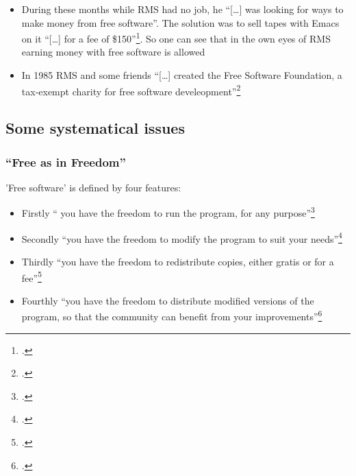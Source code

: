 \documentclass[DIV=calc,BCOR=5mm,11pt,headings=small,oneside,abstract=true, toc=bib]{scrartcl}
\begin{document}
\begin{itemize}
{  software}\footcite[cf][18]{Stallman1999a}. To give up the job was
  essential for RMS because he did not want to allow the MIT to cover his
  work\footcite[cf][18]{Stallman1999a}. But nevertheless he was supported by the
  MIT: they \enquote{[\ldots] kindly invited (him) to keep using the lab’s
  facilities}\footcite[cf][19]{Stallman1999a}:
  \begin{itemize}
    \item Firstly RMS evaluated wether he could reuse any existing compiler.
    Later on he had to write hiw own compiler, the
    GCC\footcite[cf][19]{Stallman1999a}
    \item From Sepmtember 1984 on he wrote the GNU emacs
    editor\footcite[cf][19]{Stallman1999a}
  \end{itemize}
  \item During these months while RMS had no job, he \enquote{[\ldots] was looking
  for ways to make money from free software}. The solution was to sell
  tapes with Emacs on it \enquote{[\ldots] for a fee of
  \$150}\footcite[cf][19f]{Stallman1999a}. So one can see that in the own
  eyes of RMS earning money with free software is allowed
  \item In 1985 RMS and some friends \enquote{[\ldots] created the Free Software
  Foundation, a tax-exempt charity for free software
  develeopment}\footcite[cf][21]{Stallman1999a}
\end{itemize}


\subsection{Some systematical issues}
\subsubsection{\enquote{Free as in Freedom}}
’Free software’ is defined by four features:
\begin{itemize}
  \item Firstly \enquote{ you have the freedom to run the program, for any
  purpose}\footcite[cf][18]{Stallman1999a}
  \item Secondly \enquote{you have the freedom to modify the program to suit your
  needs}\footcite[cf][18]{Stallman1999a}
  \item Thirdly \enquote{you have the freedom to redistribute copies, either
  gratis or for a fee}\footcite[cf][18]{Stallman1999a}
  \item Fourthly \enquote{you have the freedom to distribute modified versions of
  the program, so that the community can benefit from your
  improvements}\footcite[cf][18]{Stallman1999a}
\end{itemize}
\end{document}
